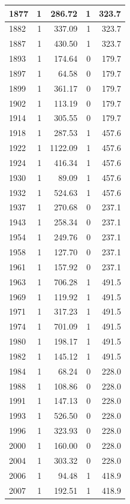 \documentclass[
  12pt,
]{book}
\begin{document}
\begin{tabular}{l|r|r|r|r}
\hline
1877 & 1 & 286.72 & 1 & 323.7\\
\hline
1882 & 1 & 337.09 & 1 & 323.7\\
\hline
1887 & 1 & 430.50 & 1 & 323.7\\
\hline
1893 & 1 & 174.64 & 0 & 179.7\\
\hline
1897 & 1 & 64.58 & 0 & 179.7\\
\hline
1899 & 1 & 361.17 & 0 & 179.7\\
\hline
1902 & 1 & 113.19 & 0 & 179.7\\
\hline
1914 & 1 & 305.55 & 0 & 179.7\\
\hline
1918 & 1 & 287.53 & 1 & 457.6\\
\hline
1922 & 1 & 1122.09 & 1 & 457.6\\
\hline
1924 & 1 & 416.34 & 1 & 457.6\\
\hline
1930 & 1 & 89.09 & 1 & 457.6\\
\hline
1932 & 1 & 524.63 & 1 & 457.6\\
\hline
1937 & 1 & 270.68 & 0 & 237.1\\
\hline
1943 & 1 & 258.34 & 0 & 237.1\\
\hline
1954 & 1 & 249.76 & 0 & 237.1\\
\hline
1958 & 1 & 127.70 & 0 & 237.1\\
\hline
1961 & 1 & 157.92 & 0 & 237.1\\
\hline
1963 & 1 & 706.28 & 1 & 491.5\\
\hline
1969 & 1 & 119.92 & 1 & 491.5\\
\hline
1971 & 1 & 317.23 & 1 & 491.5\\
\hline
1974 & 1 & 701.09 & 1 & 491.5\\
\hline
1980 & 1 & 198.17 & 1 & 491.5\\
\hline
1982 & 1 & 145.12 & 1 & 491.5\\
\hline
1984 & 1 & 68.24 & 0 & 228.0\\
\hline
1988 & 1 & 108.86 & 0 & 228.0\\
\hline
1991 & 1 & 147.13 & 0 & 228.0\\
\hline
1993 & 1 & 526.50 & 0 & 228.0\\
\hline
1996 & 1 & 323.93 & 0 & 228.0\\
\hline
2000 & 1 & 160.00 & 0 & 228.0\\
\hline
2004 & 1 & 303.32 & 0 & 228.0\\
\hline
2006 & 1 & 94.48 & 1 & 418.9\\
\hline
2007 & 1 & 192.51 & 1 & 418.9\\

\end{tabular}
\end{document}
